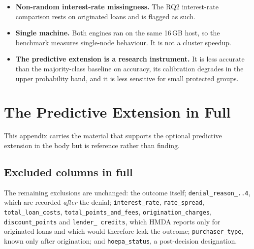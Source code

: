 \documentclass[sigconf,balance=false]{acmart}
\begin{document}
\begin{itemize}
  \item \textbf{Non-random interest-rate missingness.} The RQ2 interest-rate
        comparison rests on originated loans and is flagged as such.
  \item \textbf{Single machine.} Both engines ran on the same 16\,GB host,
        so the benchmark measures single-node behaviour. It is not a
        cluster speedup.
  \item \textbf{The predictive extension is a research instrument.} It is
        less accurate than the majority-class baseline on accuracy, its
        calibration degrades in the upper probability band, and it is less
        sensitive for small protected groups.
\end{itemize}



\FloatBarrier

\section{The Predictive Extension in Full}\label{app:predmethod}

This appendix carries the material that supports the optional predictive
extension in the body but is reference rather than finding.

\subsection{Excluded columns in full}

The remaining exclusions are unchanged: the outcome itself;
\texttt{denial\_\allowbreak reason\_..4}, which are recorded
\emph{after} the denial; \texttt{interest\_\allowbreak rate},
\texttt{rate\_\allowbreak spread}, \texttt{total\_\allowbreak loan\_\allowbreak costs},
\texttt{total\_\allowbreak points\_\allowbreak and\_\allowbreak fees},
\texttt{origination\_\allowbreak charges},
\texttt{discount\_\allowbreak points} and \texttt{lender\_\allowbreak
credits}, which HMDA reports only for originated loans and which would
therefore leak the outcome; \texttt{purchaser\_\allowbreak type}, known only
after origination; and \texttt{hoepa\_\allowbreak status}, a post-decision
designation.
\end{document}
